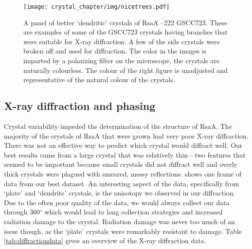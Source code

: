 \begin{figure}[htb]
  	\begin{center}
   		\texttt{[image: crystal\_chapter/img/nicetrees.pdf]}
   	\end{center}
   	\caption[`Dendritic' RsaA --222 GSCC723 crystals that were used for X-ray diffraction]{A panel of better `dendritic' crystals of RsaA --222 GSCC723. These are examples of some of the GSCC723 crystals having branches that were suitable for X-ray diffraction. A few of the side crystals were broken off and used for diffraction.  The color in the images is imparted by a polarizing filter on the microscope, the crystals are naturally colourless. The colour of the right figure is unadjusted and representative of the natural colour of the crystals.}
   	\label{fig:nice-trees}
\end{figure}   

\subsection{X-ray diffraction and phasing}\label{sec:x-ray-diffraction}

Crystal variability impeded the determination of the structure of RsaA. The majority of the crystals of RsaA that were grown had very poor X-ray diffraction. There was not an effective way to predict which crystal would diffract well. Our best results came from a large crystal that was relatively thin---two features that seemed to be important because small crystals did not diffract well and overly thick crystals were plagued with smeared, messy reflections.  shows one frame of data from our best dataset. An interesting aspect of the data, specifically from `plate' and `dendrite' crystals, is the anisotopy we observed in our diffraction. Due to the often poor quality of the data, we would always collect our data through 360$^{\circ}$ which would lead to long collection strategies and increased radiation damage to the crystal. Radiation damage was never too much of an issue though, as the `plate' crystals were remarkably resistant to damage. Table \ref{tab:diffractiondata} gives an overview of the X-ray diffraction data.

